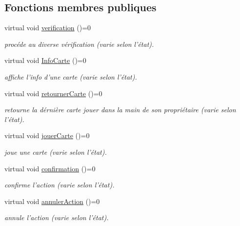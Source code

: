 \subsection*{Fonctions membres publiques}
\begin{DoxyCompactItemize}
\item 
virtual void \hyperlink{class_etat_aaf949c7b45217b76ff68414e61ef0d2a}{verification} ()=0
\begin{DoxyCompactList}\small\item\em procéde au diverse vérification (varie selon l'état). \end{DoxyCompactList}\item 
virtual void \hyperlink{class_etat_afd99ba60265bc0a82029d5fa2368acfa}{Info\-Carte} ()=0
\begin{DoxyCompactList}\small\item\em affiche l'info d'une carte (varie selon l'état). \end{DoxyCompactList}\item 
virtual void \hyperlink{class_etat_a3d2fe662ffd20147763a25c4e06b56e9}{retourner\-Carte} ()=0
\begin{DoxyCompactList}\small\item\em retourne la dérnière carte jouer dans la main de son propriétaire (varie selon l'état). \end{DoxyCompactList}\item 
virtual void \hyperlink{class_etat_aaeffe08c27b2b64560726f5df95e6f3a}{jouer\-Carte} ()=0
\begin{DoxyCompactList}\small\item\em joue une carte (varie selon l'état). \end{DoxyCompactList}\item 
virtual void \hyperlink{class_etat_a65c2e505cda8cac2989b3a0c17a70278}{confirmation} ()=0
\begin{DoxyCompactList}\small\item\em confirme l'action (varie selon l'état). \end{DoxyCompactList}\item 
virtual void \hyperlink{class_etat_ac47332db984da58192bbb1c45f1702a8}{annuler\-Action} ()=0
\begin{DoxyCompactList}\small\item\em annule l'action (varie selon l'état). \end{DoxyCompactList}\end{DoxyCompactItemize}


